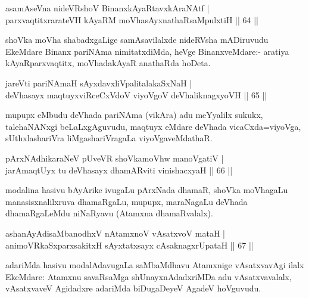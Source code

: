 \begin{shl}
asamAseVna nideVRshoV BinanxkAyaRtavxkAraNAtf |\\
parxvaqtitxrarateVH kAyaRM moVhasAyxnathaRsaMpulxtiH \hfill || 64 ||
\end{shl}

\begin{artha}
shoVka moVha shabadxgaLige samAsavilalxde nideRVsha mADiruvudu EkeMdare Binanx pariNAma nimitatxdiMda, heVge BinanxveMdare:- aratiya kAyaRparxvaqtitx, moVhadakAyaR anathaRda hoDeta.
\end{artha}

\begin{shl}
jareVti pariNAmaH sAyxdavxliVpalitalakaSxNaH |\\
deVhasayx maqtuyxviRceCxVdoV viyoVgoV deVhaliknagxyoVH \hfill || 65 ||
\end{shl}

\begin{artha}
mupupx eMbudu deVhada pariNAma (vikAra) adu meYyalilx sukukx, talehaNANxgi beLaLxgAguvudu, maqtuyx eMdare deVhada vicaCxda=viyoVga, sUthxlashariVra liMgashariVragaLa viyoVgaveMdathaR.
\end{artha}


\begin{shl}
pArxNAdhikaraNeV pUveVR shoVkamoVhw manoVgatiV  |\\
jarAmaqtUyx tu deVhasayx dhamARviti vinishacxyaH \hfill || 66 ||
\end{shl}

\begin{artha}
modalina hasivu bAyArike ivugaLu pArxNada dhamaR, shoVka moVhagaLu manasisxnalilxruva dhamaRgaLu, mupupx, maraNagaLu deVhada dhamaRgaLeMdu niNaRyavu (Atamxna dhamaRvalalx).
\end{artha}

\begin{shl}
ashanAyAdisaMbanodhxV nA\s \s tamxnoV vAsatxvoV mataH |\\
animoVRkaSxparxsakitxH sAyxtatxsayx cAsaknagxrUpataH \hfill || 67 ||
\end{shl}

\begin{artha}
adariMda hasivu modalAdavugaLa saMbaMdhavu Atamxnige vAsatxvavAgi ilalx EkeMdare: Atamxnu savaRsaMga shUnayxnAdadxriMDa adu vAsatxvavalalx, vAsatxvaveV Agidadxre adariMda biDugaDeyeV AgadeV hoVguvudu.
\end{artha}

